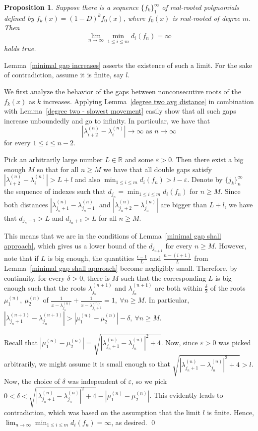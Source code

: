 \documentclass[11pt]{article}
\newtheorem{proposition}[theorem]{Proposition}
\begin{document}
\begin{proposition}
\label{minimal gap is unbounded}
Suppose there is a sequence $\{f_k\}_1^\infty$ of real-rooted polynomials defined by $f_k(x) = (1-D)^k f_0(x)$, where $f_0(x)$ is real-rooted of degree $m$. Then
\[\lim_{n\to\infty} \min_{1\leq i \leq m} d_i (f_n) = \infty\]
holds true.
\end{proposition}
\proof Lemma~\ref{minimal gap increases} asserts the existence of such a limit. For the sake of contradiction, assume it is finite, say $l$.

We first analyze the behavior of the gaps between nonconsecutive roots of the $f_k(x)$ as $k$ increases. Applying Lemma~\ref{degree two avg distance} in combination with Lemma~\ref{degree two - slowest movement} easily show that all such gaps increase unboundedly and go to infinity. In particular, we have that
\[|\lambda^{(n)}_{i+2} - \lambda^{(n)}_i|\to \infty\text{~as~$n\to\infty$}\]
for every $1\leq i \leq n-2$.

Pick an arbitrarily large number $L\in\mathbb{R}$ and some $\varepsilon > 0$. Then there exist a big enough $M$ so that for all $n\geq M$ we have that all double gaps satisfy $|\lambda^{(n)}_{i+2} - \lambda^{(n)}_i| > L + l$ and also $\min_{1\leq i \leq m} d_i (f_n)> l - \varepsilon$. Denote by $\{j_k\}_{n}^{\infty}$ the sequence of indexes such that $d_{j_n}=\min_{1\leq i \leq m} d_i (f_n)$ for $n\geq M$. Since both distances $|\lambda^{(n)}_{j_n+1} - \lambda^{(n)}_{j_n-1}|$ and $|\lambda^{(n)}_{j_n+2} - \lambda^{(n)}_{j_n}|$ are bigger than $L + l$, we have that $d_{j_n-1}> L$ and $d_{j_n+1} > L$ for all $n\geq M$. 

This means that we are in the conditions of Lemma~\ref{minimal gap shall approach}, which gives us a lower bound of the $d_{j_{n+1}}$ for every $n\geq M$. However, note that if $L$ is big enough, the quantities $\frac{i-1}{L}$ and $\frac{n-(i+1)}{L}$ from Lemma~\ref{minimal gap shall approach} become negligibly small. Therefore, by continuity, for every $\delta > 0$, there is $M$ such that the corresponding $L$ is big enough such that the roots $\lambda^{(n+1)}_{j_n}$ and $\lambda^{(n+1)}_{j_n}$ are both within $\frac{\delta}{2}$ of the roots $\mu^{(n)}_1,~\mu^{(n)}_2$ of $\frac{1}{x-\lambda^{(n)}_{j_n}} + \frac{1}{x-\lambda^{(n)}_{j_n+1}} = 1,~\forall n\geq M$. In particular, $|\lambda^{(n+1)}_{j_n+1} - \lambda^{(n+1)}_{j_n}|>|\mu^{(n)}_1 - \mu^{(n)}_2| - \delta,~\forall n\geq M$.

Recall that $|\mu^{(n)}_1 - \mu^{(n)}_2|= \sqrt{|\lambda^{(n)}_{j_n+1} - \lambda^{(n)}_{j_n}|^2 + 4}$. Now, since $\varepsilon > 0$ was picked arbitrarily, we might assume it is small enough so that $\sqrt{|\lambda^{(n)}_{j_n+1} - \lambda^{(n)}_{j_n}|^2 + 4} > l$. Now, the choice of $\delta$ was independent of $\varepsilon$, so we pick $0< \delta <\sqrt{|\lambda^{(n)}_{j_n+1} - \lambda^{(n)}_{j_n}|^2 + 4} - |\mu^{(n)}_1 - \mu^{(n)}_2|$. This evidently leads to contradiction, which was based on the assumption that the limit $l$ is finite. Hence, $\lim_{n\to\infty} \min_{1\leq i \leq m} d_i (f_n) = \infty$, as desired. \qed
\end{document}
